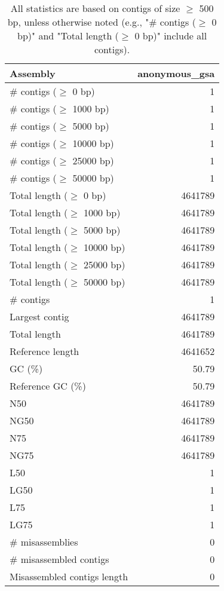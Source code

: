 \documentclass[12pt,a4paper]{article}
\begin{document}
\begin{table}[ht]
\begin{center}
\caption{All statistics are based on contigs of size $\geq$ 500 bp, unless otherwise noted (e.g., "\# contigs ($\geq$ 0 bp)" and "Total length ($\geq$ 0 bp)" include all contigs).}
\begin{tabular}{|l*{1}{|r}|}
\hline
Assembly & anonymous\_gsa \\ \hline
\# contigs ($\geq$ 0 bp) & 1 \\ \hline
\# contigs ($\geq$ 1000 bp) & 1 \\ \hline
\# contigs ($\geq$ 5000 bp) & 1 \\ \hline
\# contigs ($\geq$ 10000 bp) & 1 \\ \hline
\# contigs ($\geq$ 25000 bp) & 1 \\ \hline
\# contigs ($\geq$ 50000 bp) & 1 \\ \hline
Total length ($\geq$ 0 bp) & 4641789 \\ \hline
Total length ($\geq$ 1000 bp) & 4641789 \\ \hline
Total length ($\geq$ 5000 bp) & 4641789 \\ \hline
Total length ($\geq$ 10000 bp) & 4641789 \\ \hline
Total length ($\geq$ 25000 bp) & 4641789 \\ \hline
Total length ($\geq$ 50000 bp) & 4641789 \\ \hline
\# contigs & 1 \\ \hline
Largest contig & 4641789 \\ \hline
Total length & 4641789 \\ \hline
Reference length & 4641652 \\ \hline
GC (\%) & 50.79 \\ \hline
Reference GC (\%) & 50.79 \\ \hline
N50 & 4641789 \\ \hline
NG50 & 4641789 \\ \hline
N75 & 4641789 \\ \hline
NG75 & 4641789 \\ \hline
L50 & 1 \\ \hline
LG50 & 1 \\ \hline
L75 & 1 \\ \hline
LG75 & 1 \\ \hline
\# misassemblies & 0 \\ \hline
\# misassembled contigs & 0 \\ \hline
Misassembled contigs length & 0 \\ \hline

\end{tabular}
\end{center}
\end{table}
\end{document}
